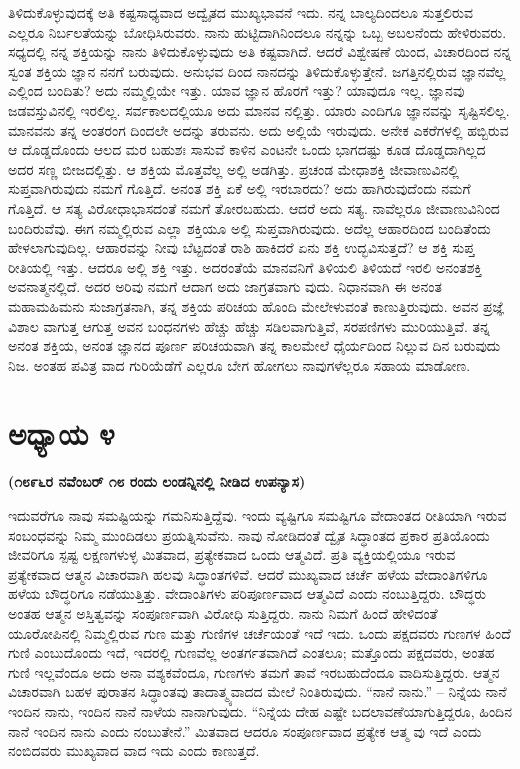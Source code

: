 ತಿಳಿದುಕೊಳ್ಳುವುದಕ್ಕೆ ಅತಿ ಕಷ್ಟಸಾಧ್ಯವಾದ ಅದ್ವೈತದ ಮುಖ್ಯಭಾವನೆ ಇದು. ನನ್ನ ಬಾಲ್ಯದಿಂದಲೂ ಸುತ್ತಲಿರುವ ಎಲ್ಲರೂ ನಿರ್ಬಲತೆಯನ್ನು ಬೋಧಿಸಿರುವರು. ನಾನು ಹುಟ್ಟಿದಾಗಿನಿಂದಲೂ ನನ್ನನ್ನು ಒಬ್ಬ ಅಬಲನೆಂದು ಹೇಳಿರುವರು. ಸಧ್ಯದಲ್ಲಿ ನನ್ನ ಶಕ್ತಿಯನ್ನು ನಾನು ತಿಳಿದುಕೊಳ್ಳುವುದು ಅತಿ ಕಷ್ಟವಾಗಿದೆ. ಆದರೆ ವಿಶ್ವೇಷಣೆ ಯಿಂದ, ವಿಚಾರದಿಂದ ನನ್ನ ಸ್ವಂತ ಶಕ್ತಿಯ ಜ್ಞಾನ ನನಗೆ ಬರುವುದು. ಅನುಭವ ದಿಂದ ನಾನದನ್ನು ತಿಳಿದುಕೊಳ್ಳುತ್ತೇನೆ. ಜಗತ್ತಿನಲ್ಲಿರುವ ಜ್ಞಾನವೆಲ್ಲ ಎಲ್ಲಿಂದ ಬಂದಿತು? ಅದು ನಮ್ಮಲ್ಲಿಯೇ ಇತ್ತು. ಯಾವ ಜ್ಞಾನ ಹೊರಗೆ ಇತ್ತು? ಯಾವುದೂ ಇಲ್ಲ. ಜ್ಞಾನವು ಜಡವಸ್ತುವಿನಲ್ಲಿ ಇರಲಿಲ್ಲ. ಸರ್ವಕಾಲದಲ್ಲಿಯೂ ಅದು ಮಾನವ ನಲ್ಲಿತ್ತು. ಯಾರು ಎಂದಿಗೂ ಜ್ಞಾನವನ್ನು ಸೃಷ್ಟಿಸಲಿಲ್ಲ. ಮಾನವನು ತನ್ನ ಅಂತರಂಗ ದಿಂದಲೇ ಅದನ್ನು ತರುವನು. ಅದು ಅಲ್ಲಿಯೆ ಇರುವುದು. ಅನೇಕ ಎಕರೆಗಳಲ್ಲಿ ಹಬ್ಬಿರುವ ಆ ದೊಡ್ಡದೊಂದು ಆಲದ ಮರ ಬಹುಶಃ ಸಾಸುವೆ ಕಾಳಿನ ಎಂಟನೇ ಒಂದು ಭಾಗದಷ್ಟು ಕೂಡ ದೊಡ್ಡದಾಗಿಲ್ಲದ ಅದರ ಸಣ್ಣ ಬೀಜದಲ್ಲಿತ್ತು. ಆ ಶಕ್ತಿಯ ಮೊತ್ತವೆಲ್ಲ ಅಲ್ಲಿ ಅಡಗಿತ್ತು. ಪ್ರಚಂಡ ಮೇಧಾಶಕ್ತಿ ಜೀವಾಣುವಿನಲ್ಲಿ ಸುಪ್ತವಾಗಿರುವುದು ನಮಗೆ ಗೊತ್ತಿದೆ. ಅನಂತ ಶಕ್ತಿ ಏಕೆ ಅಲ್ಲಿ ಇರಬಾರದು? ಅದು ಹಾಗಿರುವುದೆಂದು ನಮಗೆ ಗೊತ್ತಿದೆ. ಆ ಸತ್ಯ ವಿರೋಧಾಭಾಸದಂತೆ ನಮಗೆ ತೋರಬಹುದು. ಆದರೆ ಅದು ಸತ್ಯ. ನಾವೆಲ್ಲರೂ ಜೀವಾಣುವಿನಿಂದ ಬಂದಿರುವೆವು. ಈಗ ನಮ್ಮಲ್ಲಿರುವ ಎಲ್ಲಾ ಶಕ್ತಿಯೂ ಅಲ್ಲಿ ಸುಪ್ತವಾಗಿರುವುದು. ಅದೆಲ್ಲ ಆಹಾರದಿಂದ ಬಂದಿತೆಂದು ಹೇಳಲಾಗುವುದಿಲ್ಲ. ಆಹಾರವನ್ನು ನೀವು ಬೆಟ್ಟದಂತೆ ರಾಶಿ ಹಾಕಿದರೆ ಏನು ಶಕ್ತಿ ಉದ್ಭವಿಸುತ್ತದೆ? ಆ ಶಕ್ತಿ ಸುಪ್ತ ರೀತಿಯಲ್ಲಿ ಇತ್ತು. ಆದರೂ ಅಲ್ಲಿ ಶಕ್ತಿ ಇತ್ತು. ಅದರಂತೆಯೆ ಮಾನವನಿಗೆ ತಿಳಿಯಲಿ ತಿಳಿಯದೆ ಇರಲಿ ಅನಂತಶಕ್ತಿ ಅವನಾತ್ಮನಲ್ಲಿದೆ. ಅದರ ಅರಿವು ನಮಗೆ ಆದಾಗ ಅದು ಜಾಗ್ರತವಾಗು ವುದು. ನಿಧಾನವಾಗಿ ಈ ಅನಂತ ಮಹಾಮಹಿಮನು ಸುಜಾಗ್ರತನಾಗಿ, ತನ್ನ ಶಕ್ತಿಯ ಪರಿಚಯ ಹೊಂದಿ ಮೇಲೇಳುವಂತೆ ಕಾಣುತ್ತಿರುವುದು. ಅವನ ಪ್ರಜ್ಞೆ ವಿಶಾಲ ವಾಗುತ್ತ ಆಗುತ್ತ ಅವನ ಬಂಧನಗಳು ಹೆಚ್ಚು ಹೆಚ್ಚು ಸಡಿಲವಾಗುತ್ತಿವೆ, ಸರಪಣಿಗಳು ಮುರಿಯುತ್ತಿವೆ. ತನ್ನ ಅನಂತ ಶಕ್ತಿಯ, ಅನಂತ ಜ್ಞಾನದ ಪೂರ್ಣ ಪರಿಚಯವಾಗಿ ತನ್ನ ಕಾಲಮೇಲೆ ಧೈರ್ಯದಿಂದ ನಿಲ್ಲುವ ದಿನ ಬರುವುದು ನಿಜ. ಅಂತಹ ಪವಿತ್ರ ವಾದ ಗುರಿಯೆಡೆಗೆ ಎಲ್ಲರೂ ಬೇಗ ಹೋಗಲು ನಾವುಗಳೆಲ್ಲರೂ ಸಹಾಯ ಮಾಡೋಣ.

\chapter{ಅಧ್ಯಾಯ ೪}

\begin{center}
\textbf{(೧೮೯೬ರ ನವೆಂಬರ್​ ೧೮ ರಂದು ಲಂಡನ್ನಿನಲ್ಲಿ ನೀಡಿದ ಉಪನ್ಯಾಸ)}
\end{center}

ಇದುವರೆಗೂ ನಾವು ಸಮಷ್ಟಿಯನ್ನು ಗಮನಿಸುತ್ತಿದ್ದೆವು. ಇಂದು ವ್ಯಷ್ಟಿಗೂ ಸಮಷ್ಟಿಗೂ ವೇದಾಂತದ ರೀತಿಯಾಗಿ ಇರುವ ಸಂಬಂಧವನ್ನು ನಿಮ್ಮ ಮುಂದಿಡಲು ಪ್ರಯತ್ನಿಸುವೆನು. ನಾವು ನೋಡಿದಂತೆ ದ್ವೈತ ಸಿದ್ಧಾಂತದ ಪ್ರಕಾರ ಪ್ರತಿಯೊಂದು ಜೀವರಿಗೂ ಸ್ಪಷ್ಟ ಲಕ್ಷಣಗಳುಳ್ಳ ಮಿತವಾದ, ಪ್ರತ್ಯೇಕವಾದ ಒಂದು ಆತ್ಮವಿದೆ. ಪ್ರತಿ ವ್ಯಕ್ತಿಯಲ್ಲಿಯೂ ಇರುವ ಪ್ರತ್ಯೇಕವಾದ ಆತ್ಮನ ವಿಚಾರವಾಗಿ ಹಲವು ಸಿದ್ಧಾಂತಗಳಿವೆ. ಆದರೆ ಮುಖ್ಯವಾದ ಚರ್ಚೆ ಹಳೆಯ ವೇದಾಂತಿಗಳಿಗೂ ಹಳೆಯ ಬೌದ್ಧರಿಗೂ ನಡೆಯುತ್ತಿತ್ತು. ವೇದಾಂತಿಗಳು ಪರಿಪೂರ್ಣವಾದ ಆತ್ಮವಿದೆ ಎಂದು ನಂಬುತ್ತಿದ್ದರು. ಬೌದ್ಧರು ಅಂತಹ ಆತ್ಮನ ಅಸ್ತಿತ್ವವನ್ನು ಸಂಪೂರ್ಣವಾಗಿ ವಿರೋಧಿ ಸುತ್ತಿದ್ದರು. ನಾನು ನಿಮಗೆ ಹಿಂದೆ ಹೇಳಿದಂತೆ ಯೂರೋಪಿನಲ್ಲಿ ನಿಮ್ಮಲ್ಲಿರುವ ಗುಣ ಮತ್ತು ಗುಣಿಗಳ ಚರ್ಚೆಯಂತೆ ಇದೆ ಇದು. ಒಂದು ಪಕ್ಷದವರು ಗುಣಗಳ ಹಿಂದೆ ಗುಣಿ ಎಂಬುದೊಂದು ಇದೆ, ಇದರಲ್ಲಿ ಗುಣವೆಲ್ಲ ಅಂತರ್ಗತವಾಗಿದೆ ಎಂತಲೂ; ಮತ್ತೊಂದು ಪಕ್ಷದವರು, ಅಂತಹ ಗುಣಿ ಇಲ್ಲವೆಂದೂ ಅದು ಅನಾ ವಶ್ಯಕವೆಂದೂ, ಗುಣಗಳು ತಮಗೆ ತಾವೆ ಇರಬಹುದೆಂದೂ ವಾದಿಸುತ್ತಿದ್ದರು. ಆತ್ಮನ ವಿಚಾರವಾಗಿ ಬಹಳ ಪುರಾತನ ಸಿದ್ಧಾಂತವು ತಾದಾತ್ಮ್ಯವಾದದ ಮೇಲೆ ನಿಂತಿರುವುದು. “ನಾನೆ ನಾನು.” – ನಿನ್ನೆಯ ನಾನೆ ಇಂದಿನ ನಾನು, ಇಂದಿನ ನಾನೆ ನಾಳೆಯ ನಾನಾಗುವುದು. “ನಿನ್ನೆಯ ದೇಹ ಎಷ್ಟೇ ಬದಲಾವಣೆಯಾಗುತ್ತಿದ್ದರೂ, ಹಿಂದಿನ ನಾನೆ ಇಂದಿನ ನಾನು ಎಂದು ನಂಬುತೇನೆ.” ಮಿತವಾದ ಆದರೂ ಸಂಪೂರ್ಣವಾದ ಪ್ರತ್ಯೇಕ ಆತ್ಮ ವು ಇದೆ ಎಂದು ನಂಬಿದವರು ಮುಖ್ಯವಾದ ವಾದ ಇದು ಎಂದು ಕಾಣುತ್ತದೆ.

